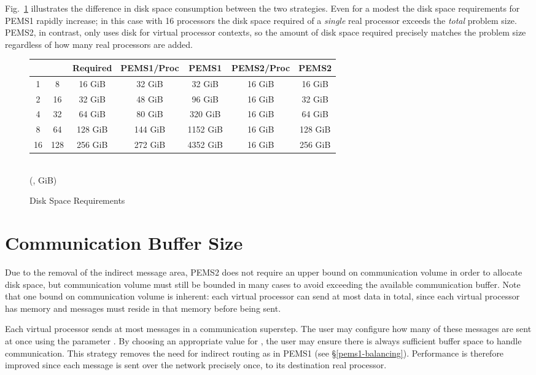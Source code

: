 \documentclass[12pt]{carletoncsthesis}
\begin{document}
Fig.~\ref{disk-space} illustrates the difference in disk space consumption
between the two strategies.  Even for a modest  the disk space
requirements for PEMS1 rapidly increase; in this case with 16 processors the
disk space required of a {\em single} real processor exceeds the {\em total}
problem size.  PEMS2, in contrast, only uses disk for virtual processor
contexts, so the amount of disk space required precisely matches the problem
size regardless of how many real processors are added.

\begin{figure}[ht]

\begin{center}
\begin{tabular}[]{ccccccc}
 &  & Required & PEMS1/Proc & PEMS1 & PEMS2/Proc & PEMS2 \\ \hline
1 & 8 & 16 GiB & 32 GiB & 32 GiB & 16 GiB & 16 GiB \\
2 & 16 & 32 GiB & 48 GiB & 96 GiB & 16 GiB & 32 GiB \\
4 & 32 & 64 GiB & 80 GiB & 320 GiB & 16 GiB & 64 GiB \\
8 & 64 & 128 GiB & 144 GiB & 1152 GiB & 16 GiB & 128 GiB \\
16 & 128 & 256 GiB & 272 GiB & 4352 GiB & 16 GiB & 256 GiB \\
\end{tabular}
\\ \bigskip
(,  GiB)
\end{center}

\label{disk-space}
\caption{Disk Space Requirements}
\end{figure}


\section{Communication Buffer Size}
\label{comm-balance}


Due to the removal of the indirect message area, PEMS2 does not require
an upper bound on communication volume in order to allocate disk space, but
communication volume must still be bounded in many cases to avoid exceeding
the available communication buffer.  Note that one bound on communication
volume is inherent: each virtual processor can send at most  data in
total, since each virtual processor has  memory and messages must reside
in that memory before being sent.

Each virtual processor sends at most  messages in a communication superstep.
The user may configure how many of these messages are sent at once using
the parameter .  By choosing an appropriate value for ,
the user may ensure there is always sufficient buffer space to handle
communication.  This strategy removes the need for indirect routing as in
PEMS1 (see \S\ref{pems1-balancing}).  Performance is therefore improved since
each message is sent over the network precisely once, to its destination
real processor.
\end{document}
